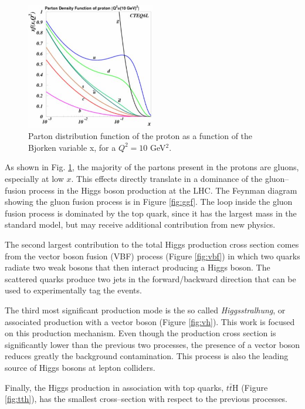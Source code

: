 \begin{figure}
\centering
\includegraphics[width=0.5\textwidth]{1_Introduction_Th_and_Exp/pics/pdf.jpg}
\caption{Parton distribution function of the proton as a function of the Bjorken variable x, for a $Q^2=10$ GeV$^2$. }
\label{fig:pdf}
\end{figure}

As shown in Fig. \ref{fig:pdf}, the majority of the partons present in the protons are gluons, especially at low $x$. This effects directly translate in a dominance of the gluon--fusion process in the Higgs boson production at the LHC. The Feynman diagram showing the gluon fusion process is in Figure \ref{fig:ggf}. The loop inside the gluon fusion process is dominated by the top quark, since it has the largest mass in the standard model, but may receive additional contribution from new physics. 

The second largest contribution to the total Higgs production cross section comes from the vector boson fusion (VBF) process (Figure \ref{fig:vbf}) in which two quarks radiate two weak bosons that then interact producing a Higgs boson. The scattered quarks produce two jets in the forward/backward direction that can be used to experimentally tag the events.

The third most significant production mode is the so called \emph{Higgsstralhung}, or associated production with a vector boson (Figure \ref{fig:vh}). This work is focused on this production mechanism. Even though the production cross section is significantly lower than the previous two processes, the presence of a vector boson reduces greatly the background contamination. This process is also the leading source of Higgs bosons at lepton colliders.

Finally, the Higgs production in association with top quarks, $t\bar{t}$H (Figure \ref{fig:tth}), has the smallest cross--section with respect to the previous processes.

